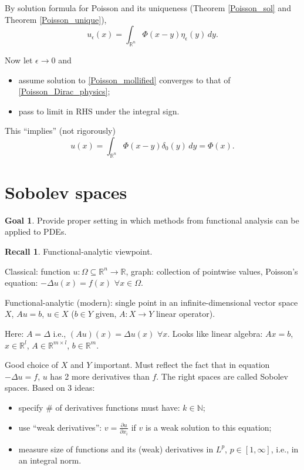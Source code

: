 \documentclass[12pt]{article}
\theoremstyle{definition}
\newtheorem*{recall}{Recall}
\newtheorem*{goal}{Goal}
\begin{document}
By solution formula for Poisson and its uniqueness (Theorem \ref{Poisson_sol} and Theorem \ref{Poisson_unique}),
\[u_\epsilon(x)=\int_{\mathbb R^n}\Phi(x-y)\eta_\epsilon(y)\,dy.\]

Now let $\epsilon\to0$ and
\begin{itemize}
\item assume solution to \eqref{Poisson_mollified} converges to that of \eqref{Poisson_Dirac_physics};
\item pass to limit in RHS under the integral sign.
\end{itemize}
This ``implies'' (not rigorously)
\[u(x)=\int_{\mathbb R^n}\Phi(x-y)\delta_0(y)\,dy=\Phi(x).\]

\section{Sobolev spaces}\label{Sobolev_spaces}
\begin{goal}
Provide proper setting in which methods from functional analysis can be applied to PDEs.
\end{goal}

\begin{recall}
Functional-analytic viewpoint.

Classical: function $u:\Omega\subseteq\mathbb R^n\rightarrow\mathbb R$, graph: collection of pointwise values, Poisson's equation: $-\Delta u(x)=f(x)$ $\forall x\in\Omega$.

Functional-analytic (modern): single point in an infinite-dimensional vector space $X$, $Au=b$, $u\in X$ ($b\in Y$ given, $A:X\rightarrow Y$ linear operator).
\end{recall}

Here: $A=\Delta$ i.e., $(Au)(x)=\Delta u(x)$ $\forall x$. Looks like linear algebra: $Ax=b$, $x\in\mathbb R^l$, $A\in\mathbb R^{m\times l}$, $b\in\mathbb R^m$.

Good choice of $X$ and $Y$ important. Must reflect the fact that in equation $-\Delta u=f$, $u$ has 2 more derivatives than $f$. The right spaces are called Sobolev spaces. Based on 3 ideas:
\begin{itemize}
\item specify \# of derivatives functions must have: $k\in\mathbb N$;
\item use ``weak derivatives'': $v=\frac{\partial u}{\partial x_i}$ if $v$ is a weak solution to this equation;
\item measure size of functions and its (weak) derivatives in $L^p$, $p\in[1,\infty]$, i.e., in an integral norm.
\end{itemize}
\end{document}
